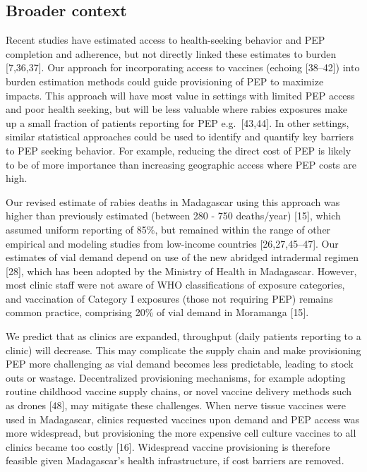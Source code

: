 \documentclass[
]{book}
\begin{document}
\hypertarget{broader-context}{%
\subsection{Broader context}\label{broader-context}}

Recent studies have estimated access to health-seeking behavior and PEP
completion and adherence, but not directly linked these estimates to
burden {[}7,36,37{]}. Our approach for incorporating access to vaccines
(echoing {[}38--42{]}) into burden estimation methods could guide
provisioning of PEP to maximize impacts. This approach will have most
value in settings with limited PEP access and poor health seeking, but
will be less valuable where rabies exposures make up a small fraction of
patients reporting for PEP e.g.~{[}43,44{]}. In other settings, similar
statistical approaches could be used to identify and quantify key
barriers to PEP seeking behavior. For example, reducing the direct cost
of PEP is likely to be of more importance than increasing geographic
access where PEP costs are high.

Our revised estimate of rabies deaths in Madagascar using this approach
was higher than previously estimated (between 280 - 750 deaths/year)
{[}15{]}, which assumed uniform reporting of 85\%, but remained within the
range of other empirical and modeling studies from low-income countries
{[}26,27,45--47{]}. Our estimates of vial demand depend on use of the new
abridged intradermal regimen {[}28{]}, which has been adopted by the
Ministry of Health in Madagascar. However, most clinic staff were not
aware of WHO classifications of exposure categories, and vaccination of
Category I exposures (those not requiring PEP) remains common practice,
comprising 20\% of vial demand in Moramanga {[}15{]}.

We predict that as clinics are expanded, throughput (daily patients
reporting to a clinic) will decrease. This may complicate the supply
chain and make provisioning PEP more challenging as vial demand becomes
less predictable, leading to stock outs or wastage. Decentralized
provisioning mechanisms, for example adopting routine childhood vaccine
supply chains, or novel vaccine delivery methods such as drones {[}48{]},
may mitigate these challenges. When nerve tissue vaccines were used in
Madagascar, clinics requested vaccines upon demand and PEP access was
more widespread, but provisioning the more expensive cell culture
vaccines to all clinics became too costly {[}16{]}. Widespread vaccine
provisioning is therefore feasible given Madagascar's health
infrastructure, if cost barriers are removed.
\end{document}
